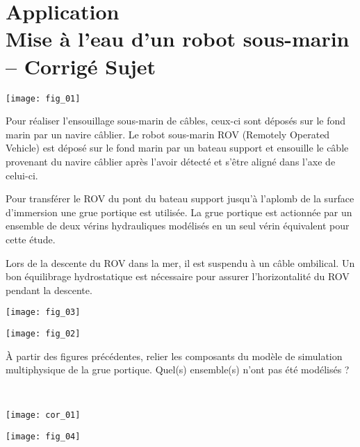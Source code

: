 \chapter*{Application  \\ 
Mise à l'eau d'un robot sous-marin -- \ifprof Corrigé \else Sujet \fi}

\iflivret {} \else
\ifprof  {} \else \fi
\fi

\setcounter{question}{0}
\begin{marginfigure}
\texttt{[image: fig\_01]}
\end{marginfigure}



\ifprof
\else
Pour réaliser l’ensouillage sous-marin de câbles, ceux-ci sont déposés sur le fond marin par un navire câblier. Le robot sous-marin ROV (Remotely Operated Vehicle) est déposé sur le fond marin par un bateau support et ensouille le câble provenant
du navire câblier après l’avoir détecté et s’être aligné dans l’axe de celui-ci.

Pour transférer le ROV du pont du bateau support jusqu’à l’aplomb de la surface d’immersion une grue portique est utilisée. 
La grue portique est actionnée par un ensemble de deux vérins hydrauliques modélisés en un seul vérin équivalent pour cette étude.

Lors de la descente du ROV dans la mer, il est suspendu à un câble ombilical. Un bon équilibrage hydrostatique est
nécessaire pour assurer l’horizontalité du ROV pendant la descente.

\begin{marginfigure}
\texttt{[image: fig\_03]}
\end{marginfigure}

\begin{center}
\texttt{[image: fig\_02]}
\end{center}

\fi

\begin{question}
À partir des figures précédentes, relier les composants du modèle de simulation
multiphysique de la grue portique. Quel(s) ensemble(s) n’ont pas été modélisés ?
\end{question}

\ifprof
\begin{corrige}~\\

\begin{center}
\texttt{[image: cor\_01]}
\end{center}
\end{corrige}
\else
\fi


\ifprof
\else
\begin{center}
\texttt{[image: fig\_04]}
\end{center}
\fi
